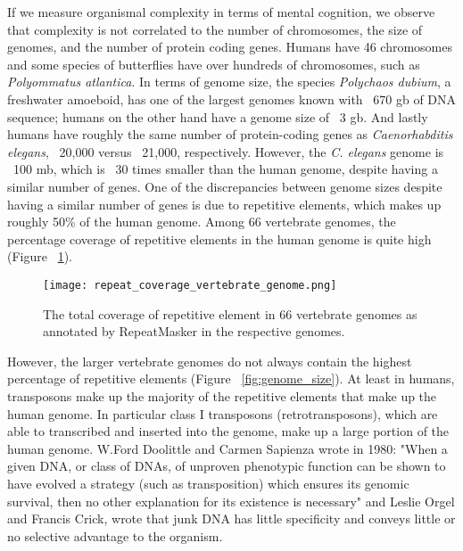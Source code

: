 If we measure organismal complexity in terms of mental cognition, we observe that complexity is not correlated to the number of chromosomes, the size of genomes, and the number of protein coding genes. Humans have 46 chromosomes and some species of butterflies have over hundreds of chromosomes, such as \textit{Polyommatus atlantica}. In terms of genome size, the species \textit{Polychaos dubium}, a freshwater amoeboid, has one of the largest genomes known with ~670 gb of DNA sequence; humans on the other hand have a genome size of ~3 gb. And lastly humans have roughly the same number of protein-coding genes as \textit{Caenorhabditis elegans}, ~20,000 versus ~21,000, respectively. However, the \textit{C. elegans} genome is ~100 mb\cite{celegans1998sequencing}, which is ~30 times smaller than the human genome, despite having a similar number of genes. One of the discrepancies between genome sizes despite having a similar number of genes is due to repetitive elements, which makes up roughly 50\% of the human genome. Among 66 vertebrate genomes, the percentage coverage of repetitive elements in the human genome is quite high (Figure ~\ref{fig:repeat_coverage_vertebrate_genome}).

\begin{figure}[h]
   \centering
   \texttt{[image: repeat\_coverage\_vertebrate\_genome.png]}
   \caption[Coverage of repetitive elements in vertebrate genomes]{The total coverage of repetitive element in 66 vertebrate genomes as annotated by RepeatMasker in the respective genomes\cite{tang2014repcoverage}.}
   \label{fig:repeat_coverage_vertebrate_genome}
\end{figure}

However, the larger vertebrate genomes do not always contain the highest percentage of repetitive elements (Figure ~\ref{fig:genome_size}). At least in humans, transposons make up the majority of the repetitive elements that make up the human genome. In particular class I transposons (retrotransposons), which are able to transcribed and inserted into the genome, make up a large portion of the human genome. W.Ford Doolittle and Carmen Sapienza wrote in 1980\cite{doolittle1980selfish}: "When a given DNA, or class of DNAs, of unproven phenotypic function can be shown to have evolved a strategy (such as transposition) which ensures its genomic survival, then no other explanation for its existence is necessary" and Leslie Orgel and Francis Crick, wrote that junk DNA has little specificity and conveys little or no selective advantage to the organism\cite{orgel1980selfish}.

